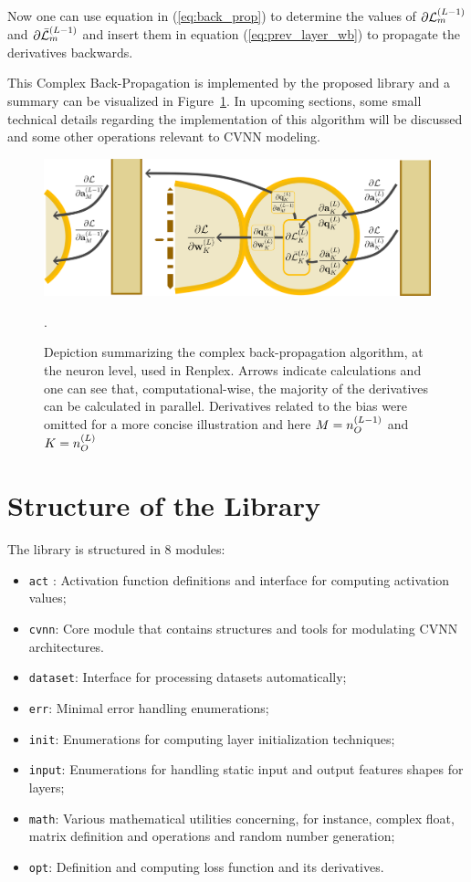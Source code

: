 Now one can use equation in (\ref{eq:back_prop}) to determine the values of $ \partial\mathcal{L}^{(L-1)}_{m} $ and $ \partial\bar{\mathcal{L}}^{(L-1)}_{m} $ and insert them in equation (\ref{eq:prev_layer_wb}) to propagate the derivatives backwards.

This Complex Back-Propagation is implemented by the proposed library and a summary can be visualized in Figure~\ref{fig:backprop}. In upcoming sections, some small technical details regarding the implementation of this algorithm will be discussed and some other operations relevant to \gls{CVNN} modeling.

\begin{figure}[htbp]
	\centering
	\includegraphics[width=1.0\textwidth]{ch3/assets/cp_backprop.png}
	\caption{Depiction summarizing the complex back-propagation algorithm, at the neuron level, used in Renplex. Arrows indicate calculations and one can see that, computational-wise, the majority of the derivatives can be calculated in parallel. Derivatives related to the bias were omitted for a more concise illustration and here $ M = n^{(L-1)}_{O} $ and $ K = n^{(L)}_{O} $}.
	\label{fig:backprop}
\end{figure}

\section{Structure of the Library}

The library is structured in 8 modules:

\begin{itemize}
	\item \texttt{act} : Activation function definitions and interface for computing activation values;
	\item \texttt{cvnn}: Core module that contains structures and tools for modulating \gls{CVNN} architectures.
	\item \texttt{dataset}: Interface for processing datasets automatically;
	\item \texttt{err}: Minimal error handling enumerations;
	\item \texttt{init}: Enumerations for computing layer initialization techniques;
	\item \texttt{input}: Enumerations for handling static input and output features shapes for layers;
	\item \texttt{math}: Various mathematical utilities concerning, for instance, complex float, matrix definition and operations and random number generation;
	\item \texttt{opt}: Definition and computing loss function and its derivatives.
\end{itemize}

